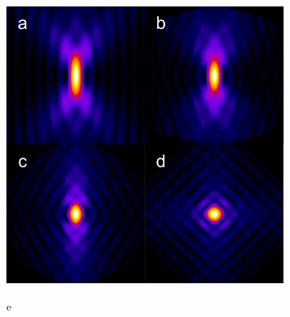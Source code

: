   \begin{figure}
    \centering
    \begin{subfigure}[t]{0.45\textwidth}
      \includegraphics[width=\columnwidth]{simu/psf}
    \end{subfigure}	
    \begin{subfigure}[b]{0.5\textwidth}
    \qquad e
    

\end{subfigure}
\end{figure}
